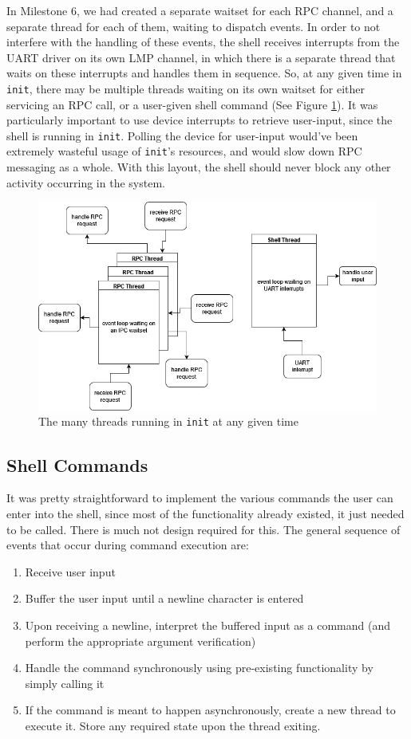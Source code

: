 In Milestone 6, we had created a separate waitset for each RPC channel, and a separate thread for each of them, waiting to dispatch events. In order to not interfere with the handling of these events, the shell receives interrupts from the UART driver on its own LMP channel, in which there is a separate thread that waits on these interrupts and handles them in sequence. So, at any given time in \texttt{init}, there may be multiple threads waiting on its own waitset for either servicing an RPC call, or a user-given shell command (See Figure \ref{figure:m7-shell-threads}). It was particularly important to use device interrupts to retrieve user-input, since the shell is running in \texttt{init}. Polling the device for user-input would've been extremely wasteful usage of \texttt{init}'s resources, and would slow down RPC messaging as a whole. With this layout, the shell should never block any other activity occurring in the system.  

\begin{figure}[ht]
    \centering
    \includegraphics[width=0.8\columnwidth]{images/m7-shell-threads.jpg}
    \caption{The many threads running in \texttt{init} at any given time}
    \label{figure:m7-shell-threads}
\end{figure}

\subsection{Shell Commands}
It was pretty straightforward to implement the various commands the user can enter into the shell, since most of the functionality already existed, it just needed to be called. There is much not design required for this. The general sequence of events that occur during command execution are: 

\begin{enumerate}
    \item Receive user input
    \item Buffer the user input until a newline character is entered
    \item Upon receiving a newline, interpret the buffered input as a command (and perform the appropriate argument verification)
    \item Handle the command synchronously using pre-existing functionality by simply calling it
    \item If the command is meant to happen asynchronously, create a new thread to execute it. Store any required state upon the thread exiting.
\end{enumerate}


